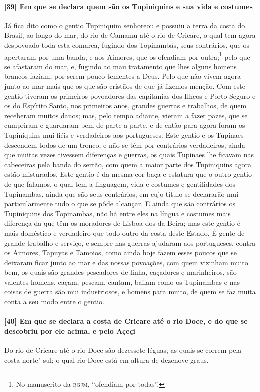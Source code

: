 \begin{linenumbers}
\paragraph{[39] Em que se declara quem são os Tupiniquins e sua vida e costumes} \quad
Já fica dito como o gentio Tupiniquim senhoreou e possuiu a terra da costa do Brasil, ao
longo do mar, do rio de Camamu até o rio de Cricare, o qual tem agora despovoado toda esta
comarca, fugindo dos Topinambás, seus contrários, que os apertaram por uma banda, e aos
Aimores, que os ofendiam por outra;\footnote{ No manuscrito da \textsc{bgjm}, ``ofendiam
por todas''.} pelo que se afastaram do mar, e, fugindo ao mau tratamento que lhes alguns
homens brancos faziam, por serem pouco tementes a Deus. Pelo que não vivem agora junto ao
mar mais que os que são cristãos de que já fizemos menção. Com este gentio tiveram os
primeiros povoadores das capitanias dos Ilheos e Porto Seguro e os do Espírito Santo, nos
primeiros anos, grandes guerras e trabalhos, de quem receberam muitos danos; mas, pelo
tempo adiante, vieram a fazer pazes, que se cumpriram e guardaram bem de parte a parte, e
de então para agora foram os Tupiniquins mui fiéis e verdadeiros aos portugueses. Este
gentio e os Tupinaes descendem todos de um tronco, e não se têm por contrários
verdadeiros, ainda que muitas vezes tivessem diferenças e guerras, os quais Tupinaes lhe
ficavam nas cabeceiras pela banda do sertão, com quem a maior parte dos Tupiniquins agora
estão misturados. Este gentio é da mesma cor baça e estatura que o outro gentio de que
falamos, o qual tem a linguagem, vida e costumes e gentilidades dos Tupinambas, ainda que
são seus contrários, em cujo título se declararão mui particularmente tudo o que se pôde
alcançar. E ainda que são contrários os Tupiniquins dos Topinambas, não há entre eles na
língua e costumes mais diferença da que têm os moradores de Lisboa dos da Beira; mas este
gentio é mais doméstico e verdadeiro que todo outro da costa deste Estado. É gente de
grande trabalho e serviço, e sempre nas guerras ajudaram aos portugueses, contra os
Aimores, Tapuyas e Tamoios, como ainda hoje fazem esses poucos que se deixaram ficar junto
ao mar e das nossas povoações, com quem vizinham muito bem, os quais são grandes
pescadores de linha, caçadores e marinheiros, são valentes homens, caçam, pescam, cantam,
bailam como os Tupinambas e nas coisas de guerra são mui industriosos, e homens para
muito, de quem se faz muita conta a seu modo entre o gentio.

\paragraph{[40] Em que se declara a costa de Cricare até o rio Doce, e do que se descobriu
por ele acima, e pelo Açeçi} \quad
Do rio de Cricare até o rio Doce são dezessete léguas, as quais se correm pela costa
norte"-sul; o qual rio Doce está em altura de dezenove graus.


\end{linenumbers}
